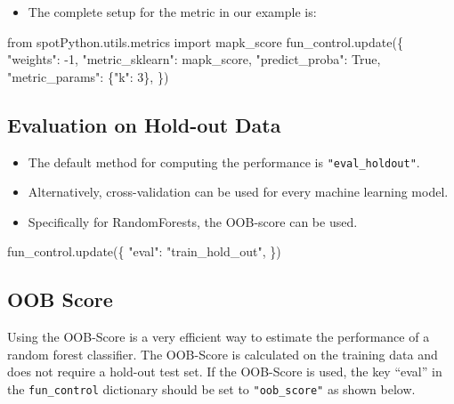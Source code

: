 \documentclass[
  letterpaper,
  DIV=11,
  numbers=noendperiod]{scrreprt}
\newenvironment{Shaded}{\begin{snugshade}}{\end{snugshade}}
\newcommand{\DecValTok}[1]{\textcolor[rgb]{0.68,0.00,0.00}{#1}}
\newcommand{\ImportTok}[1]{\textcolor[rgb]{0.00,0.46,0.62}{#1}}
\newcommand{\NormalTok}[1]{\textcolor[rgb]{0.00,0.23,0.31}{#1}}
\newcommand{\OperatorTok}[1]{\textcolor[rgb]{0.37,0.37,0.37}{#1}}
\newcommand{\StringTok}[1]{\textcolor[rgb]{0.13,0.47,0.30}{#1}}
\newcommand{\VariableTok}[1]{\textcolor[rgb]{0.07,0.07,0.07}{#1}}
\providecommand{\tightlist}{%
  \setlength{\itemsep}{0pt}\setlength{\parskip}{0pt}}\usepackage{longtable,booktabs,array}
\begin{document}
\begin{itemize}
\tightlist
\item
  The complete setup for the metric in our example is:
\end{itemize}

\begin{Shaded}
\begin{Highlighting}[]
\ImportTok{from}\NormalTok{ spotPython.utils.metrics }\ImportTok{import}\NormalTok{ mapk\_score}
\NormalTok{fun\_control.update(\{}
               \StringTok{"weights"}\NormalTok{: }\OperatorTok{{-}}\DecValTok{1}\NormalTok{,}
               \StringTok{"metric\_sklearn"}\NormalTok{: mapk\_score,}
               \StringTok{"predict\_proba"}\NormalTok{: }\VariableTok{True}\NormalTok{,}
               \StringTok{"metric\_params"}\NormalTok{: \{}\StringTok{"k"}\NormalTok{: }\DecValTok{3}\NormalTok{\},}
\NormalTok{               \})}
\end{Highlighting}
\end{Shaded}

\hypertarget{evaluation-on-hold-out-data}{%
\subsection{Evaluation on Hold-out
Data}\label{evaluation-on-hold-out-data}}

\begin{itemize}
\tightlist
\item
  The default method for computing the performance is
  \texttt{"eval\_holdout"}.
\item
  Alternatively, cross-validation can be used for every machine learning
  model.
\item
  Specifically for RandomForests, the OOB-score can be used.
\end{itemize}

\begin{Shaded}
\begin{Highlighting}[]
\NormalTok{fun\_control.update(\{}
    \StringTok{"eval"}\NormalTok{: }\StringTok{"train\_hold\_out"}\NormalTok{,}
\NormalTok{\})}
\end{Highlighting}
\end{Shaded}

\hypertarget{sec-oob-score-16}{%
\subsection{OOB Score}\label{sec-oob-score-16}}

Using the OOB-Score is a very efficient way to estimate the performance
of a random forest classifier. The OOB-Score is calculated on the
training data and does not require a hold-out test set. If the OOB-Score
is used, the key ``eval'' in the \texttt{fun\_control} dictionary should
be set to \texttt{"oob\_score"} as shown below.
\end{document}
